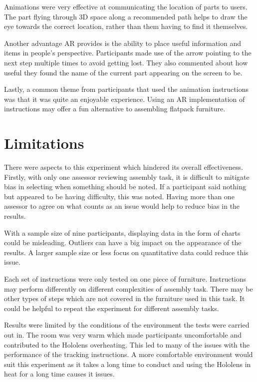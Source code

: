 \documentclass{l4proj}
\begin{document}
Animations were very effective at communicating the location of parts to users. The part flying through 3D space along a recommended path helps to draw the eye towards the correct location, rather than them having to find it themselves.

Another advantage AR provides is the ability to place useful information and items in people's perspective. Participants made use of the arrow pointing to the next step multiple times to avoid getting lost. They also commented about how useful they found the name of the current part appearing on the screen to be.

Lastly, a common theme from participants that used the animation instructions was that it was quite an enjoyable experience. Using an AR implementation of instructions may offer a fun alternative to assembling flatpack furniture.

\section{Limitations}
\label{sec:exLimitations}

There were aspects to this experiment which hindered its overall effectiveness. Firstly, with only one assessor reviewing assembly task, it is difficult to mitigate bias in selecting when something should be noted. If a participant said nothing but appeared to be having difficulty, this was noted. Having more than one assessor to agree on what counts as an issue would help to reduce bias in the results.

With a sample size of nine participants, displaying data in the form of charts could be misleading. Outliers can have a big impact on the appearance of the results. A larger sample size or less focus on quantitative data could reduce this issue.

Each set of instructions were only tested on one piece of furniture. Instructions may perform differently on different complexities of assembly task. There may be other types of steps which are not covered in the furniture used in this task. It could be helpful to repeat the experiment for different assembly tasks.

Results were limited by the conditions of the environment the tests were carried out in. The room was very warm which made participants uncomfortable and contributed to the Hololens overheating. This led to many of the issues with the performance of the tracking instructions. A more comfortable environment would suit this experiment as it takes a long time to conduct and using the Hololens in heat for a long time causes it issues.
\end{document}
